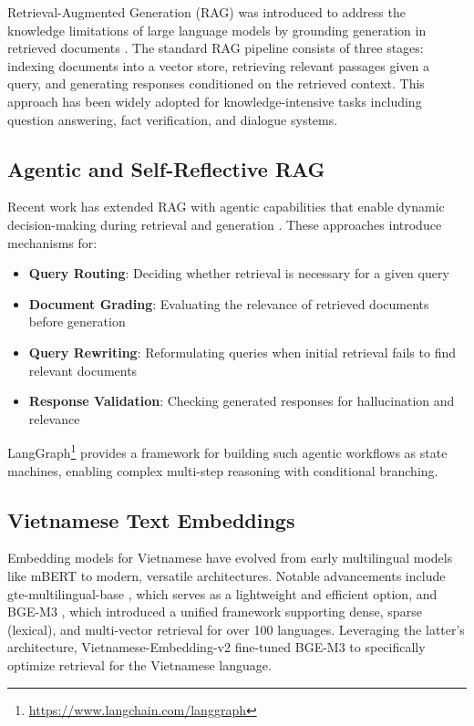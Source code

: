 \documentclass[letterpaper]{article} %
\begin{document}
Retrieval-Augmented Generation (RAG) was introduced to address the knowledge limitations of large language models by grounding generation in retrieved documents \cite{lewis2020retrieval}. The standard RAG pipeline consists of three stages: indexing documents into a vector store, retrieving relevant passages given a query, and generating responses conditioned on the retrieved context. This approach has been widely adopted for knowledge-intensive tasks including question answering, fact verification, and dialogue systems.

\subsection{Agentic and Self-Reflective RAG}

Recent work has extended RAG with agentic capabilities that enable dynamic decision-making during retrieval and generation \cite{asai2023selfraglearningretrievegenerate, yan2024correctiveretrievalaugmentedgeneration}. These approaches introduce mechanisms for:
\begin{itemize}
	\item \textbf{Query Routing}: Deciding whether retrieval is necessary for a given query 
	\item \textbf{Document Grading}: Evaluating the relevance of retrieved documents before generation
	\item \textbf{Query Rewriting}: Reformulating queries when initial retrieval fails to find relevant documents
	\item \textbf{Response Validation}: Checking generated responses for hallucination and relevance
\end{itemize}

LangGraph\footnote{\url{https://www.langchain.com/langgraph}} provides a framework for building such agentic workflows as state machines, enabling complex multi-step reasoning with conditional branching.

\subsection{Vietnamese Text Embeddings}

Embedding models for Vietnamese have evolved from early multilingual models like mBERT to modern, versatile architectures. Notable advancements include gte-multilingual-base \cite{zhang2024mgte}, which serves as a lightweight and efficient option, and BGE-M3 \cite{bge-m3}, which introduced a unified framework supporting dense, sparse (lexical), and multi-vector retrieval for over 100 languages. Leveraging the latter's architecture, Vietnamese-Embedding-v2 \cite{Vietnamese_Embedding} fine-tuned BGE-M3 to specifically optimize retrieval for the Vietnamese language.
\end{document}
